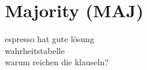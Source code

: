 \section{Majority (MAJ)}
\label{sec:knf:maj}


espresso hat gute lösung\\
wahrheitstabelle\\
warum reichen die klauseln?